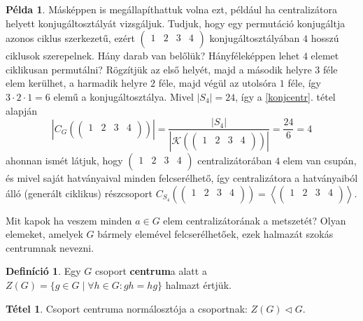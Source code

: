 \documentclass[12pt]{book}
\theoremstyle{plain} %
\theoremstyle{definition} %
\newtheorem{defi/}{Definíció}[section]
\newenvironment{defi}
  {\renewcommand{\qedsymbol}{$\clubsuit$}%
   \pushQED{\qed}\begin{defi/}}
  {\popQED\end{defi/}}
\newtheorem{pl}{Példa}[section]
\newtheorem{theo/}{Tétel}[section]
\newenvironment{theo}
  {\renewcommand{\qedsymbol}{$\clubsuit$}%
   \pushQED{\qed}\begin{theo/}}
  {\popQED\end{theo/}}
\theoremstyle{remark}
\renewcommand\qedsymbol{$\blacksquare$}
\numberwithin{equation}{section}  %
\begin{document}
\begin{pl}
		Másképpen is megállapíthattuk volna ezt, például ha centralizátora helyett konjugáltosztályát vizsgáljuk. Tudjuk, hogy egy permutáció konjugáltja azonos ciklus szerkezetű, ezért
		$\begin{pmatrix}
		1 & 2 & 3 & 4 \\
		\end{pmatrix}$ konjugáltosztályában $4$ hosszú ciklusok szerepelnek. Hány darab van belőlük? Hányféleképpen lehet $4$ elemet ciklikusan permutálni? Rögzítjük az első helyét, majd a második helyre $3$ féle elem kerülhet, a harmadik helyre $2$ féle, majd végül az utolsóra $1$ féle, így $3\cdot 2 \cdot 1= 6$ elemű a konjugáltosztálya. Mivel $|S_4| = 24$, így a \ref{konjcentr}. tétel alapján
		\[ \left|C_G\left(\begin{pmatrix}
		1 & 2 & 3 & 4 \\
		\end{pmatrix}\right)\right| = \dfrac{|S_4|}{\left|\mathcal{K}\left(\begin{pmatrix}
			1 & 2 & 3 & 4 \\
			\end{pmatrix}\right)\right|} = \dfrac{24}{6} = 4  \]
		ahonnan ismét látjuk, hogy $\begin{pmatrix}
		1 & 2 & 3 & 4 \\
		\end{pmatrix}$ centralizátorában $4$ elem van csupán, és mivel saját hatványaival minden felcserélhető, így centralizátora a hatványaiból álló (generált ciklikus) részcsoport $C_{S_4} \left(\begin{pmatrix}
		1 & 2 & 3 & 4 \\
		\end{pmatrix}\right) = \left \langle \begin{pmatrix}
		1 & 2 & 3 & 4 \\
		\end{pmatrix} \right \rangle $.
	\end{pl}

	Mit kapok ha veszem minden $a\in G$ elem centralizátorának a metszetét? Olyan elemeket, amelyek $G$ bármely elemével felcserélhetőek, ezek halmazát szokás centrumnak nevezni.
	
	\begin{defi}
		Egy $G$ csoport \textbf{centrum}a alatt a $Z(G) = \{ g\in G \mid \forall h\in G\colon gh = hg  \}$ halmazt értjük.
	\end{defi}

	\begin{theo}\label{centnorm}
		Csoport centruma normálosztója a csoportnak: $Z(G)\triangleleft G$.
	\end{theo}
\end{document}
